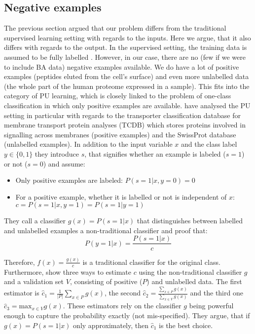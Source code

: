 \documentclass[msc,deptreport,ai]{infthesis} %
\begin{document}
	\subsection{Negative examples}
	\label{subsec:negative}
		The previous section argued that our problem differs from the traditional supervised learning setting with regards to the inputs. Here we argue, that it also differs with regards to the output. In the supervised setting, the training data is assumed to be fully labelled \cite{bekker_learning_2020}. However, in our case, there are no (few if we were to include \gls{BA} data) negative examples available. We do have a lot of positive examples (peptides eluted from the cell's surface) and even more unlabelled data (the whole part of the human proteome expressed in a sample). This fits into the category of \gls{PU} learning, which is closely linked to the problem of one-class classification in which only positive examples are available. \cite{elkan_learning_2008} have analysed the \gls{PU} setting in particular with regards to the transporter classification database for membrane transport protein analyses (TCDB) which stores proteins involved in signalling across membranes (positive examples) and the SwissProt database (unlabelled examples). In addition to the input variable $x$ and the class label $y \in \{0, 1\}$ they introduce $s$, that signifies whether an example is labeled ($s = 1$) or not ($s = 0$) and assume:
		
		\begin{itemize}
			\item Only positive examples are labeled: $P(s=1 | x, y=0) = 0$
			\item For a positive example, whether it is labelled or not is independent of $x$: \\ $c = P(s  = 1 | x, y=1) = P(s = 1 | y = 1)$
		\end{itemize}
	
		They call a classifier $g(x) = P(s = 1 | x)$ that distinguishes between labelled and unlabelled examples a non-traditional classifier and proof that:
		\begin{equation}
			P(y = 1 | x) = \frac{P(s = 1 | x)}{c}
			\label{equ:PU}
		\end{equation}
		
		Therefore, $f(x) = \frac{g(x)}{c}$ is a traditional classifier for the original class. Furthermore, \cite{elkan_learning_2008} show three ways to estimate $c$ using the non-traditional classifier $g$ and a validation set $V$, consisting of positive ($P$) and unlabelled data. The first estimator is $\hat c_1 = \frac{1}{|P|}\sum_{x \in P}  g(x)$, the second $\hat c_2 = \frac{\sum_{x \in P} g(x)}{\sum_{x \in V}g(x)}$ and the third one $\hat c_3 = \textrm{max}_{x \in V}g(x)$. These estimators rely on the classifier $g$ being powerful enough to capture the probability exactly (not mis-specified). They argue, that if $g(x) = P(s = 1 | x)$ only approximately, then $\hat c_1$ is the best choice.
		
\end{document}
